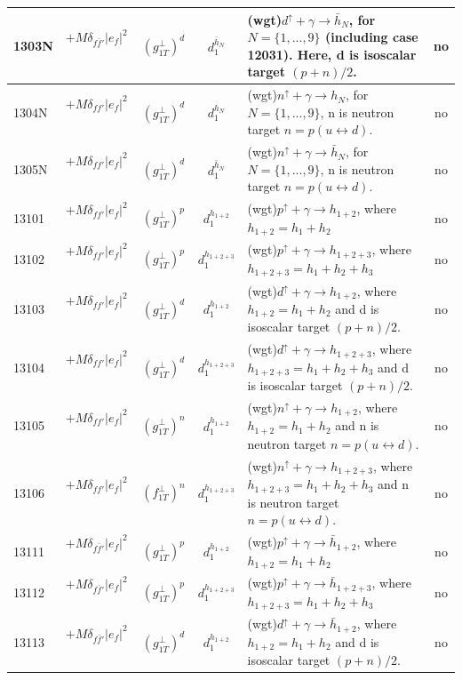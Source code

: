 \documentclass[prd,nofootinbib,eqsecnum,final]{revtex4}
\renewcommand{\(}{\left(}
\renewcommand{\)}{\right)}
\renewcommand{\[}{\left[}
\renewcommand{\]}{\right]}
\begin{document}
\begin{center}
\begin{longtable}{||l|p{6cm}|c|c||p{7cm}|c||}
\\\hline
1303N & $+M\delta_{f\bar f'}|e_f|^2$~~&$(g_{1T}^\perp)^{d}$ & $d^{\bar h_N}_1$ & (wgt)$d^{\uparrow}+\gamma\to \bar h_N$, for $N=\{1,...,9\}$ (including case 12031). Here, d is isoscalar target $(p+n)/2$. & no
\\\hline\hline
1304N & $+M\delta_{ff'}|e_f|^2$~~&$(g_{1T}^\perp)^d$ & $d^{h_N}_1$ & (wgt)$n^{\uparrow}+\gamma\to h_N$, for $N=\{1,...,9\}$, n is neutron target $n=p(u\leftrightarrow d)$. & no
\\\hline
1305N & $+M\delta_{ff'}|e_f|^2$~~&$(g_{1T}^\perp)^d$ & $d^{\bar h_N}_1$ & (wgt)$n^{\uparrow}+\gamma\to \bar h_N$, for $N=\{1,...,9\}$, n is neutron target $n=p(u\leftrightarrow d)$. & no
\\\hline \hline
13101 & $+M\delta_{ff'}|e_f|^2$~~&$(g_{1T}^\perp)^{p}$ & $d^{h_{1+2}}_1$ & (wgt)$p^{\uparrow}+\gamma\to h_{1+2}$, where $h_{1+2}=h_1+h_2$ & no
\\\hline
13102 & $+M\delta_{ff'}|e_f|^2$~~&$(g_{1T}^\perp)^{p}$ & $d^{h_{1+2+3}}_1$ & (wgt)$p^{\uparrow}+\gamma\to h_{1+2+3}$, where $h_{1+2+3}=h_1+h_2+h_3$ & no
\\\hline
13103 & $+M\delta_{ff'}|e_f|^2$~~&$(g_{1T}^\perp)^{d}$ & $d^{h_{1+2}}_1$ & (wgt)$d^{\uparrow}+\gamma\to h_{1+2}$, where $h_{1+2}=h_1+h_2$ and d is isoscalar target $(p+n)/2$. & no
\\\hline
13104 & $+M\delta_{ff'}|e_f|^2$~~&$(g_{1T}^\perp)^{d}$ & $d^{h_{1+2+3}}_1$ & (wgt)$d^{\uparrow}+\gamma\to h_{1+2+3}$, where $h_{1+2+3}=h_1+h_2+h_3$ and d is isoscalar target $(p+n)/2$. & no
\\\hline
13105 & $+M\delta_{ff'}|e_f|^2$~~&$(g_{1T}^\perp)^{n}$ & $d^{h_{1+2}}_1$ & (wgt)$n^{\uparrow}+\gamma\to h_{1+2}$, where $h_{1+2}=h_1+h_2$ and n is neutron target $n=p(u\leftrightarrow d)$. & no
\\\hline
13106 & $+M\delta_{ff'}|e_f|^2$~~&$(f_{1T}^\perp)^{n}$ & $d^{h_{1+2+3}}_1$ & (wgt)$n^{\uparrow}+\gamma\to h_{1+2+3}$, where $h_{1+2+3}=h_1+h_2+h_3$ and n is neutron target $n=p(u\leftrightarrow d)$. & no
\\\hline
13111 & $+M\delta_{f\bar f'}|e_f|^2$~~&$(g_{1T}^\perp)^{p}$ & $d^{h_{1+2}}_1$ & (wgt)$p^{\uparrow}+\gamma\to \bar h_{1+2}$, where $h_{1+2}=h_1+h_2$ & no
\\\hline
13112 & $+M\delta_{f\bar f'}|e_f|^2$~~&$(g_{1T}^\perp)^{p}$ & $d^{h_{1+2+3}}_1$ & (wgt)$p^{\uparrow}+\gamma\to \bar h_{1+2+3}$, where $h_{1+2+3}=h_1+h_2+h_3$ & no
\\\hline
13113 & $+M\delta_{f\bar f'}|e_f|^2$~~&$(g_{1T}^\perp)^{d}$ & $d^{h_{1+2}}_1$ & (wgt)$d^{\uparrow}+\gamma\to \bar h_{1+2}$, where $h_{1+2}=h_1+h_2$ and d is isoscalar target $(p+n)/2$. & no

\end{longtable}
\end{center}
\end{document}
